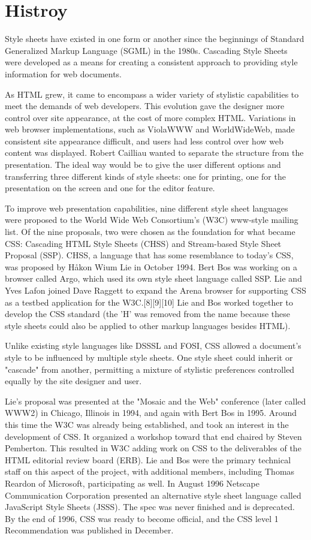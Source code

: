 \chapter{Histroy}

Style sheets have existed in one form or another since the beginnings of Standard Generalized Markup Language (SGML) in the 1980s. Cascading Style Sheets were developed as a means for creating a consistent approach to providing style information for web documents.


As HTML grew, it came to encompass a wider variety of stylistic capabilities to meet the demands of web developers. This evolution gave the designer more control over site appearance, at the cost of more complex HTML. Variations in web browser implementations, such as ViolaWWW and WorldWideWeb, made consistent site appearance difficult, and users had less control over how web content was displayed. Robert Cailliau wanted to separate the structure from the presentation. The ideal way would be to give the user different options and transferring three different kinds of style sheets: one for printing, one for the presentation on the screen and one for the editor feature.


To improve web presentation capabilities, nine different style sheet languages were proposed to the World Wide Web Consortium's (W3C) www-style mailing list. Of the nine proposals, two were chosen as the foundation for what became CSS: Cascading HTML Style Sheets (CHSS) and Stream-based Style Sheet Proposal (SSP). CHSS, a language that has some resemblance to today's CSS, was proposed by Håkon Wium Lie in October 1994. Bert Bos was working on a browser called Argo, which used its own style sheet language called SSP. Lie and Yves Lafon joined Dave Raggett to expand the Arena browser for supporting CSS as a testbed application for the W3C.[8][9][10] Lie and Bos worked together to develop the CSS standard (the 'H' was removed from the name because these style sheets could also be applied to other markup languages besides HTML).

Unlike existing style languages like DSSSL and FOSI, CSS allowed a document's style to be influenced by multiple style sheets. One style sheet could inherit or "cascade" from another, permitting a mixture of stylistic preferences controlled equally by the site designer and user.


Lie's proposal was presented at the "Mosaic and the Web" conference (later called WWW2) in Chicago, Illinois in 1994, and again with Bert Bos in 1995. Around this time the W3C was already being established, and took an interest in the development of CSS. It organized a workshop toward that end chaired by Steven Pemberton. This resulted in W3C adding work on CSS to the deliverables of the HTML editorial review board (ERB). Lie and Bos were the primary technical staff on this aspect of the project, with additional members, including Thomas Reardon of Microsoft, participating as well. In August 1996 Netscape Communication Corporation presented an alternative style sheet language called JavaScript Style Sheets (JSSS). The spec was never finished and is deprecated. By the end of 1996, CSS was ready to become official, and the CSS level 1 Recommendation was published in December.

